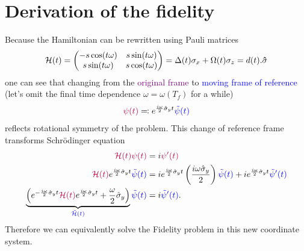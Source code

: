 \section{Derivation of the fidelity}
Because the Hamiltonian can be rewritten using Pauli matrices
\begin{equation}
    \mathcal{H}(t) = 
        \begin{pmatrix}
         -s \cos (t \omega ) & s \sin (t \omega ) \\
         s \sin (t \omega ) & s \cos (t \omega ) \\
        \end{pmatrix}
        =\Delta(t)\sigma_x+ \Omega(t)\sigma_z= d(t).\mathbf{\hat\sigma}
\end{equation}
one can see that changing from the \textcolor{purple}{original frame} to \textcolor{blue}{moving frame of reference} (let's omit the final time dependence $\omega=\omega(T_f)$ for a while) 
\begin{equation}
    \textcolor{purple}{\psi(t)} \eqqcolon e^{\frac{i \omega}{2}\hat\sigma_y t} \textcolor{blue}{\tilde\psi(t)}
\end{equation}
reflects rotational symmetry of the problem. This change of reference frame transforms Schr\"odinger equation
\begin{equation}
    \begin{split}
        \textcolor{purple}{\mathcal{H}(t)\psi(t)} &= i\textcolor{purple}{\psi'(t)}\\
        \textcolor{purple}{\mathcal{H}(t)} e^{\frac{i \omega}{2}\hat\sigma_y t}\textcolor{blue}{\tilde\psi(t)} &= i e^{\frac{i \omega}{2}\hat\sigma_y t} \left(\frac{i\omega\hat\sigma_y}{2}\right)\textcolor{blue}{\tilde\psi(t)}+ie^{\frac{i \omega}{2}\hat\sigma_y t}\textcolor{blue}{\tilde\psi'(t)}\\
        \underbrace{\left(e^{-\frac{i \omega}{2}\hat\sigma_y t} \textcolor{purple}{\mathcal{H}(t)}e^{\frac{i \omega}{2}\hat\sigma_y t}+ \frac{\omega}{2}\hat\sigma_y\right)}_{\textcolor{blue}{\tilde{\mathcal{H}}(t)}}\textcolor{blue}{\tilde\psi(t)}&=i\textcolor{blue}{\tilde\psi'(t)}.
    \end{split}
\end{equation}
Therefore we can equivalently solve the Fidelity problem in this new coordinate system.

